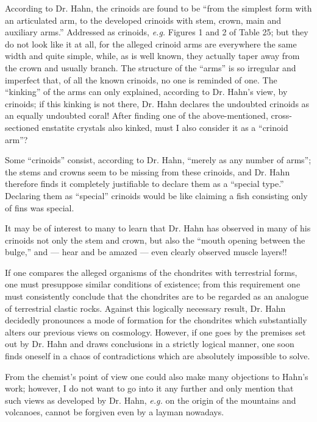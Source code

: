\documentclass[a4paper, 12pt, oneside]{article}
\begin{document}
According to Dr. Hahn, the crinoids are found to be ``from the simplest form with an articulated arm, to the developed crinoids with stem, crown, main and auxiliary arms.'' Addressed as crinoids, \emph{e.g.} Figures 1 and 2 of Table 25; but they do not look like it at all, for the alleged crinoid arms are everywhere the same width and quite simple, while, as is well known, they actually taper away from the crown and usually branch. The structure of the ``arms'' is so irregular and imperfect that, of all the known crinoids, no one is reminded of one. The ``kinking'' of the arms can only explained, according to Dr. Hahn's view, by crinoids; if this kinking is not there, Dr. Hahn declares the undoubted crinoids as an equally undoubted coral! After finding one of the above-mentioned, cross-sectioned enstatite crystals also kinked, must I also consider it as a ``crinoid arm''?

Some ``crinoids'' consist, according to Dr. Hahn, ``merely as any number of arms''; the stems and crowns seem to be missing from these crinoids, and Dr. Hahn therefore finds it completely justifiable to declare them as a ``special type.'' Declaring them as ``special'' crinoids would be like claiming a fish consisting only of fins was special.

It may be of interest to many to learn that Dr. Hahn has observed in many of his crinoids not only the stem and crown, but also the ``mouth opening between the bulge,'' and --- hear and be amazed --- even clearly observed muscle layers!!

If one compares the alleged organisms of the chondrites with terrestrial forms, one must presuppose similar conditions of existence; from this requirement one must consistently conclude that the chondrites are to be regarded as an analogue of terrestrial clastic rocks. Against this logically necessary result, Dr. Hahn decidedly pronounces a mode of formation for the chondrites which substantially alters our previous views on cosmology. However, if one goes by the premises set out by Dr. Hahn and draws conclusions in a strictly logical manner, one soon finds oneself in a chaos of contradictions which are absolutely impossible to solve.

From the chemist's point of view one could also make many objections to Hahn's work; however, I do not want to go into it any further and only mention that such views as developed by Dr. Hahn, \emph{e.g.} on the origin of the mountains and volcanoes, cannot be forgiven even by a layman nowadays.
\end{document}
